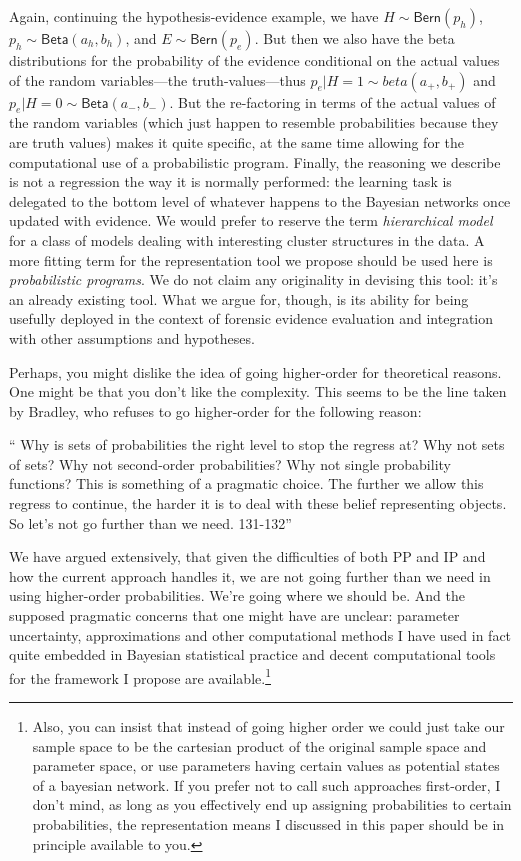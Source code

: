 \documentclass[
  10pt,
  dvipsnames,enabledeprecatedfontcommands]{scrartcl}
\renewenvironment{quote}
{\list{}{\leftmargin=1em\rightmargin=1em}\item[]``}
{''\endlist}
\begin{document}
Again, continuing the hypothesis-evidence example, we have
\(H \sim \mathsf{Bern}(p_h)\), \(p_h \sim \mathsf{Beta}(a_h, b_h)\), and
\(E\sim \mathsf{Bern}(p_e)\). But then we also have the beta
distributions for the probability of the evidence conditional on the
actual values of the random variables---the truth-values---thus
\(p_e \vert H = 1 \sim beta(a_{+}, b_{+} )\) and
\(p_e \vert H = 0 \sim \mathsf{Beta}(a_{-}, b_{-})\). But the
re-factoring in terms of the actual values of the random variables
(which just happen to resemble probabilities because they are truth
values) makes it quite specific, at the same time allowing for the
computational use of a probabilistic program. Finally, the reasoning we
describe is not a regression the way it is normally performed: the
learning task is delegated to the bottom level of whatever happens to
the Bayesian networks once updated with evidence. We would prefer to
reserve the term \emph{hierarchical model} for a class of models dealing
with interesting cluster structures in the data. A more fitting term for
the representation tool we propose should be used here is
\emph{probabilistic programs}. We do not claim any originality in
devising this tool: it's an already existing tool. What we argue for,
though, is its ability for being usefully deployed in the context of
forensic evidence evaluation and integration with other assumptions and
hypotheses.

Perhaps, you might dislike the idea of going higher-order for
theoretical reasons. One might be that you don't like the complexity.
This seems to be the line taken by Bradley, who refuses to go
higher-order for the following reason:

\begin{quote}
Why is sets of probabilities the right level to stop the regress at? Why not sets of sets? Why not second-order 
probabilities? Why not single probability functions? This is something of a pragmatic choice. The further we 
allow this regress to continue, the harder it is to deal with these belief representing objects. So let's not
 go further than we need. 131-132\end{quote}

We have argued extensively, that given the difficulties of both PP and
IP and how the current approach handles it, we are not going further
than we need in using higher-order probabilities. We're going where we
should be. And the supposed pragmatic concerns that one might have are
unclear: parameter uncertainty, approximations and other computational
methods I have used in fact quite embedded in Bayesian statistical
practice and decent computational tools for the framework I propose are
available.\footnote{Also, you can insist that instead of
  going higher order we could just take our sample space to be the cartesian product of the original sample
   space and parameter space, or use parameters having certain values as potential states of a bayesian network. 
   If you prefer not to call such approaches first-order, I don't mind, as long as you effectively end up
    assigning probabilities to certain probabilities, the representation means I discussed in this paper
     should be in principle available to you.}
\end{document}
